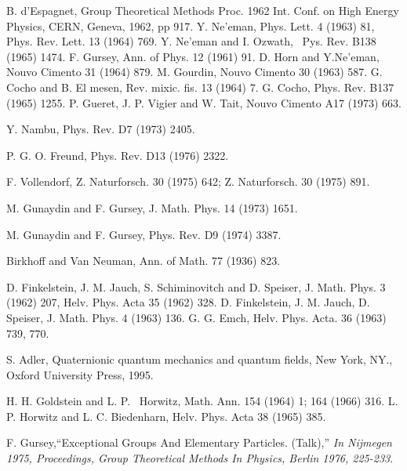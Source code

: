 \documentclass[a4paper,12pt]{book}
\begin{document}
\begin{thebibliography}{999}
  B. d'Espagnet, Group Theoretical Methods Proc. 1962 Int. Conf.
on High Energy Physics, CERN, Geneva, 1962, pp 917.\newline
Y. Ne'eman, Phys. Lett. 4 (1963) 81, Phys. Rev. Lett. 13 (1964) 769.\newline
Y. Ne'eman and I. Ozwath, \ Pys. Rev. B138 (1965) 1474.\newline
F. Gursey, Ann. of Phys. 12 (1961) 91.\newline
D. Horn and Y.Ne'eman, Nouvo Cimento 31 (1964) 879.\newline
M. Gourdin, Nouvo Cimento 30 (1963) 587.\newline
G. Cocho and B. El mesen, Rev. mixic. fis. 13 (1964) 7.\newline
G. Cocho, Phys. Rev. B137 (1965) 1255.\newline
P. Gueret, J. P. Vigier and W. Tait, Nouvo Cimento A17 (1973) 663.

  Y. Nambu, Phys. Rev. D7 (1973) 2405.

  P. G. O. Freund, Phys. Rev. D13 (1976) 2322.

  F. Vollendorf, Z. Naturforsch. 30 (1975) 642; Z.
Naturforsch. 30 (1975) 891.

  M. Gunaydin and F. Gursey, J. Math. Phys. 14 (1973) 1651.

  M. Gunaydin and F. Gursey, Phys. Rev. D9 (1974) 3387.

  Birkhoff and Van Neuman, Ann. of Math. 77 (1936) 823.

  D. Finkelstein, J. M. Jauch, S. Schiminovitch and D. Speiser,
J. Math. Phys. 3 (1962) 207, Helv. Phys. Acta 35 (1962) 328.\newline
D. Finkelstein, J. M. Jauch, D. Speiser, J. Math. Phys. 4 (1963) 136.\newline
G. G. Emch, Helv. Phys. Acta. 36 (1963) 739, 770.

  S. Adler, Quaternionic quantum mechanics and quantum
fields, New York, NY., Oxford University Press, 1995.

  H. H. Goldstein and L. P. \ Horwitz, Math. Ann. 154 (1964) 1;
164 (1966) 316. \newline
L. P. Horwitz and L. C. Biedenharn, Helv. Phys. Acta 38 (1965) 385.

  F. Gursey,``Exceptional Groups And Elementary Particles.
(Talk),'' \textit{In Nijmegen 1975, Proceedings, Group Theoretical Methods
In Physics, Berlin 1976, 225-233}.


\end{thebibliography}
\end{document}
